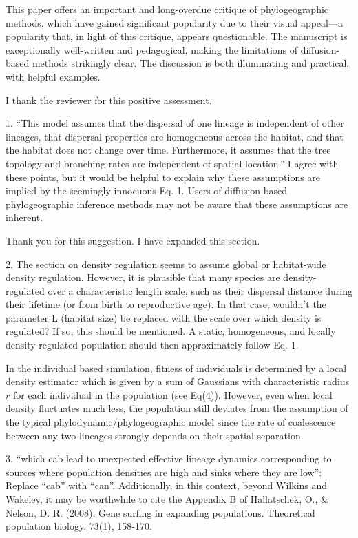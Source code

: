 \documentclass[11pt, oneside]{article}   	%
\newcommand{\response}[1]{{\color{black}{\bf Response:} #1}}
\begin{document}
This paper offers an important and long-overdue critique of phylogeographic methods, which have gained significant popularity due to their visual appeal—a popularity that, in light of this critique, appears questionable. The manuscript is exceptionally well-written and pedagogical, making the limitations of diffusion-based methods strikingly clear. The discussion is both illuminating and practical, with helpful examples.


\response{I thank the reviewer for this positive assessment.}

1.  ``This model assumes that the dispersal of one lineage is independent of other lineages, that dispersal properties are homogeneous across the habitat, and that the habitat does not change over time. Furthermore, it assumes that the tree topology and branching rates are independent of spatial location.'' I agree with these points, but it would be helpful to explain why these assumptions are implied by the seemingly innocuous Eq. 1. Users of diffusion-based phylogeographic inference methods may not be aware that these assumptions are inherent.

\response{Thank you for this suggestion. I have expanded this section.}

2. The section on density regulation seems to assume global or habitat-wide density regulation. However, it is plausible that many species are density-regulated over a characteristic length scale, such as their dispersal distance during their lifetime (or from birth to reproductive age). In that case, wouldn’t the parameter  L  (habitat size) be replaced with the scale over which density is regulated? If so, this should be mentioned. A static, homogeneous, and locally density-regulated population should then approximately follow Eq. 1.

\response{In the individual based simulation, fitness of individuals is determined by a local density estimator which is given by a sum of Gaussians with characteristic radius $r$ for each individual in the population (see Eq(4)). However, even when local density fluctuates much less, the population still deviates from the assumption of the typical phylodynamic/phylogeographic model since the rate of coalescence between any two lineages strongly depends on their spatial separation.}


3. ``which cab lead to unexpected effective lineage dynamics corresponding to sources where population densities are high and sinks where they are low'': Replace ``cab'' with ``can''. Additionally, in this context, beyond Wilkins and Wakeley, it may be worthwhile to cite the Appendix B of Hallatschek, O., \& Nelson, D. R. (2008). Gene surfing in expanding populations. Theoretical population biology, 73(1), 158-170.
\end{document}
